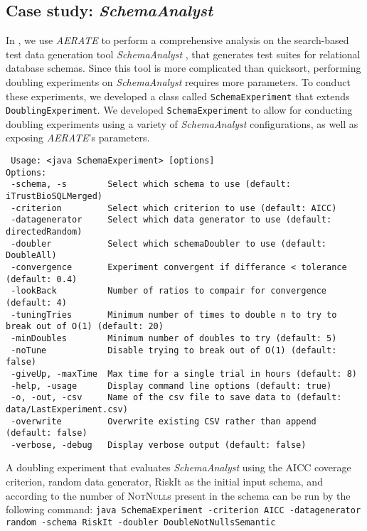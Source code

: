 \documentclass[10pt,twocolumn]{article}
\begin{document}
    \subsection{Case study: \textit{SchemaAnalyst}}
    In \cite{kinneer2015}, we use \textit{AERATE} to perform a
    comprehensive analysis on the search-based test data generation 
    tool \textit{SchemaAnalyst} \cite{kapfhammer2013}, that generates
    test suites for relational database schemas. Since this tool is more
    complicated than quicksort, performing doubling experiments on
    \textit{SchemaAnalyst} requires more parameters.  To conduct these
    experiments, we developed a class called \texttt{SchemaExperiment}
    that extends \texttt{DoublingExperiment}.  We developed 
    \texttt{SchemaExperiment} to allow for conducting doubling
    experiments using a variety of \textit{SchemaAnalyst} configurations,
    as well as exposing \textit{AERATE}'s parameters.
{\scriptsize
\begin{verbatim}
 Usage: <java SchemaExperiment> [options]
Options:  
 -schema, -s        Select which schema to use (default: iTrustBioSQLMerged)
 -criterion         Select which criterion to use (default: AICC)
 -datagenerator     Select which data generator to use (default: directedRandom)
 -doubler           Select which schemaDoubler to use (default: DoubleAll)
 -convergence       Experiment convergent if differance < tolerance (default: 0.4)
 -lookBack          Number of ratios to compair for convergence (default: 4)
 -tuningTries       Minimum number of times to double n to try to break out of O(1) (default: 20)
 -minDoubles        Minimum number of doubles to try (default: 5)
 -noTune            Disable trying to break out of O(1) (default: false)
 -giveUp, -maxTime  Max time for a single trial in hours (default: 8)
 -help, -usage      Display command line options (default: true)
 -o, -out, -csv     Name of the csv file to save data to (default: data/LastExperiment.csv)
 -overwrite         Overwrite existing CSV rather than append (default: false)
 -verbose, -debug   Display verbose output (default: false)
\end{verbatim}
}

    A doubling experiment that evaluates \textit{SchemaAnalyst} using
    the AICC coverage criterion, random data generator, RiskIt as the initial input
    schema, and according to the number of \textsc{NotNull}s present in the
    schema can be run by the following command:
    \texttt{java SchemaExperiment -criterion AICC -datagenerator random -schema RiskIt -doubler DoubleNotNullsSemantic}
\end{document}
